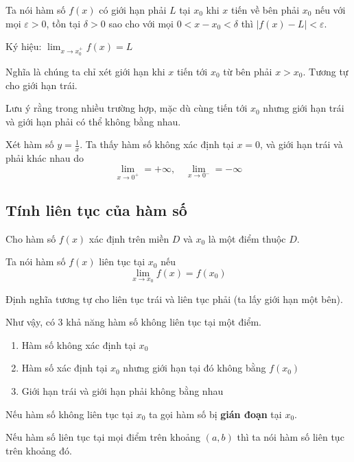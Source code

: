 \documentclass{mynotes}
\begin{document}
\begin{definition}
    Ta nói hàm số $f(x)$ có giới hạn phải $L$ tại $x_0$ khi $x$ tiến về bên phải $x_0$ nếu với mọi $\varepsilon > 0$, tồn tại $\delta > 0$ sao cho với mọi $0 < x - x_0 < \delta$  thì $|f(x) - L| < \varepsilon$.

    Ký hiệu: $\displaystyle{\lim_{x \to x_0^+} f(x) = L}$
\end{definition}

Nghĩa là chúng ta chỉ xét giới hạn khi $x$ tiến tới $x_0$ từ bên phải $x > x_0$. Tương tự cho giới hạn trái.

Lưu ý rằng trong nhiều trường hợp, mặc dù cùng tiến tới $x_0$ nhưng giới hạn trái và giới hạn phải có thể không bằng nhau.

\begin{example}
    Xét hàm số $y = \frac{1}{x}$. Ta thấy hàm số không xác định tại $x = 0$, và giới hạn trái và phải khác nhau do \[\lim_{x \to 0^+} = +\infty, \quad \lim_{x \to 0^-} = -\infty\]
\end{example}

\subsection*{Tính liên tục của hàm số}

Cho hàm số $f(x)$ xác định trên miền $D$ và $x_0$ là một điểm thuộc $D$.

\begin{definition}
    Ta nói hàm số $f(x)$ liên tục tại $x_0$ nếu \[\lim_{x \to x_0} f(x) = f(x_0)\]
\end{definition}

Định nghĩa tương tự cho liên tục trái và liên tục phải (ta lấy giới hạn một bên).

Như vậy, có 3 khả năng hàm số không liên tục tại một điểm.

\begin{enumerate}[noitemsep]
    \item Hàm số không xác định tại $x_0$
    \item Hàm số xác định tại $x_0$ nhưng giới hạn tại đó không bằng $f(x_0)$
    \item Giới hạn trái và giới hạn phải không bằng nhau
\end{enumerate}

Nếu hàm số không liên tục tại $x_0$ ta gọi hàm số bị \textbf{gián đoạn} tại $x_0$.

Nếu hàm số liên tục tại mọi điểm trên khoảng $(a, b)$ thì ta nói hàm số liên tục trên khoảng đó.
\end{document}
